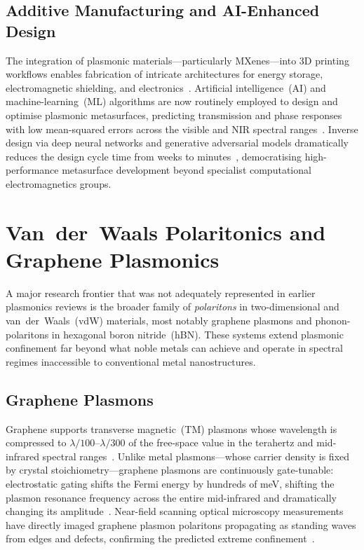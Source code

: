 \documentclass[twocolumn,10pt]{article}
\begin{document}
\subsection{Additive Manufacturing and AI-Enhanced Design}

The integration of plasmonic materials---particularly MXenes---into 3D
printing workflows enables fabrication of intricate architectures for
energy storage, electromagnetic shielding, and
electronics~\cite{gogotsi2019rise,anasori2017mxenes}.  Artificial
intelligence~(AI) and machine-learning~(ML) algorithms are now routinely
employed to design and optimise plasmonic metasurfaces, predicting
transmission and phase responses with low mean-squared errors across the
visible and NIR spectral ranges~\cite{malkiel2018plasmonic}.  Inverse
design via deep neural networks and generative adversarial models
dramatically reduces the design cycle time from weeks to
minutes~\cite{malkiel2018plasmonic}, democratising high-performance
metasurface development beyond specialist computational
electromagnetics groups.

\section{Van~der~Waals Polaritonics and Graphene Plasmonics}
\label{sec:vdw}

A major research frontier that was not adequately represented in earlier
plasmonics reviews is the broader family of \textit{polaritons} in
two-dimensional and van~der~Waals~(vdW) materials, most notably
graphene plasmons and phonon-polaritons in hexagonal boron
nitride~(hBN).  These systems extend plasmonic confinement far
beyond what noble metals can achieve and operate in spectral regimes
inaccessible to conventional metal nanostructures.

\subsection{Graphene Plasmons}

Graphene supports transverse magnetic~(TM) plasmons whose wavelength
is compressed to $\lambda/100$--$\lambda/300$ of the free-space value
in the terahertz and mid-infrared spectral
ranges~\cite{grigorenko2012graphene}.  Unlike metal plasmons---whose
carrier density is fixed by crystal stoichiometry---graphene plasmons
are continuously gate-tunable: electrostatic gating shifts the Fermi
energy by hundreds of meV, shifting the plasmon resonance frequency
across the entire mid-infrared and dramatically changing its
amplitude~\cite{grigorenko2012graphene}.  Near-field scanning optical
microscopy measurements have directly imaged graphene plasmon
polaritons propagating as standing waves from edges and defects,
confirming the predicted extreme
confinement~\cite{grigorenko2012graphene}.
\end{document}
